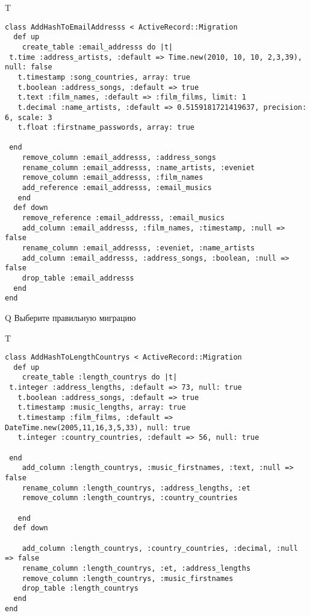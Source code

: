 T
\begin{verbatim}
class AddHashToEmailAddresss < ActiveRecord::Migration
  def up
    create_table :email_addresss do |t|
 t.time :address_artists, :default => Time.new(2010, 10, 10, 2,3,39), null: false
   t.timestamp :song_countries, array: true
   t.boolean :address_songs, :default => true
   t.text :film_names, :default => :film_films, limit: 1
   t.decimal :name_artists, :default => 0.5159181721419637, precision: 6, scale: 3
   t.float :firstname_passwords, array: true

 end
    remove_column :email_addresss, :address_songs
    rename_column :email_addresss, :name_artists, :eveniet
    remove_column :email_addresss, :film_names
    add_reference :email_addresss, :email_musics
   end
  def down
    remove_reference :email_addresss, :email_musics
    add_column :email_addresss, :film_names, :timestamp, :null => false
    rename_column :email_addresss, :eveniet, :name_artists
    add_column :email_addresss, :address_songs, :boolean, :null => false
    drop_table :email_addresss
  end
end
\end{verbatim}
Q
Выберите правильную миграцию

T
\begin{verbatim}
class AddHashToLengthCountrys < ActiveRecord::Migration
  def up
    create_table :length_countrys do |t|
 t.integer :address_lengths, :default => 73, null: true
   t.boolean :address_songs, :default => true
   t.timestamp :music_lengths, array: true
   t.timestamp :film_films, :default => DateTime.new(2005,11,16,3,5,33), null: true
   t.integer :country_countries, :default => 56, null: true

 end
    add_column :length_countrys, :music_firstnames, :text, :null => false
    rename_column :length_countrys, :address_lengths, :et
    remove_column :length_countrys, :country_countries

   end
  def down

    add_column :length_countrys, :country_countries, :decimal, :null => false
    rename_column :length_countrys, :et, :address_lengths
    remove_column :length_countrys, :music_firstnames
    drop_table :length_countrys
  end
end
\end{verbatim}

